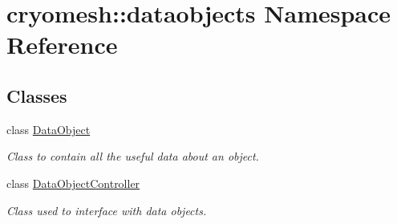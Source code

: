 \hypertarget{namespacecryomesh_1_1dataobjects}{\section{cryomesh\-:\-:dataobjects \-Namespace \-Reference}
\label{namespacecryomesh_1_1dataobjects}
}
\subsection*{\-Classes}
\begin{DoxyCompactItemize}
\item 
class \hyperlink{classcryomesh_1_1dataobjects_1_1DataObject}{\-Data\-Object}
\begin{DoxyCompactList}\small\item\em \-Class to contain all the useful data about an object. \end{DoxyCompactList}\item 
class \hyperlink{classcryomesh_1_1dataobjects_1_1DataObjectController}{\-Data\-Object\-Controller}
\begin{DoxyCompactList}\small\item\em \-Class used to interface with data objects. \end{DoxyCompactList}\end{DoxyCompactItemize}
